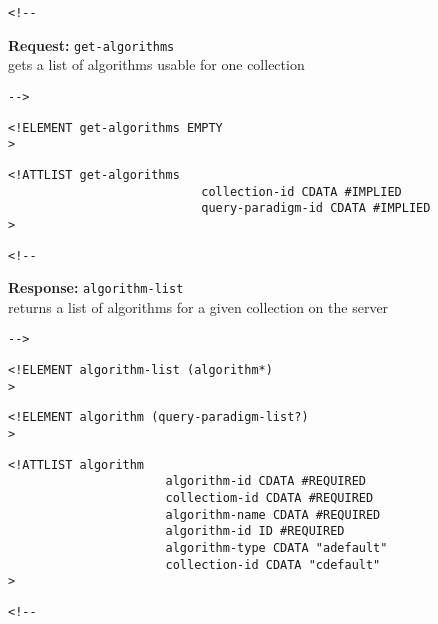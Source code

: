 \documentclass{article}
\newcommand{\requesttitle}[1]{\textbf{Request: }{\texttt{#1}}\\}
\newcommand{\responsetitle}[1]{\textbf{Response: }{\texttt{#1}}\\}
\begin{document}
\begin{verbatim}<!--\end{verbatim}
  

     \requesttitle{get-algorithms}

     gets a list of algorithms usable for one collection  

       
 \begin{verbatim}-->\end{verbatim}



\begin{verbatim}
<!ELEMENT get-algorithms EMPTY 
>\end{verbatim}

\begin{verbatim}
<!ATTLIST get-algorithms 
                           collection-id CDATA #IMPLIED
                           query-paradigm-id CDATA #IMPLIED
>\end{verbatim}

\begin{verbatim}<!--\end{verbatim}
   

     \responsetitle{algorithm-list}

     returns a list of algorithms for a given collection on the server 

       
 \begin{verbatim}-->\end{verbatim}



\begin{verbatim}
<!ELEMENT algorithm-list (algorithm*) 
>\end{verbatim}

\begin{verbatim}
<!ELEMENT algorithm (query-paradigm-list?) 
>\end{verbatim}

\begin{verbatim}
<!ATTLIST algorithm 
                      algorithm-id CDATA #REQUIRED
                      collectiom-id CDATA #REQUIRED
                      algorithm-name CDATA #REQUIRED
                      algorithm-id ID #REQUIRED
                      algorithm-type CDATA "adefault"
                      collection-id CDATA "cdefault"
>\end{verbatim}

\begin{verbatim}<!--\end{verbatim}
   
\end{document}
